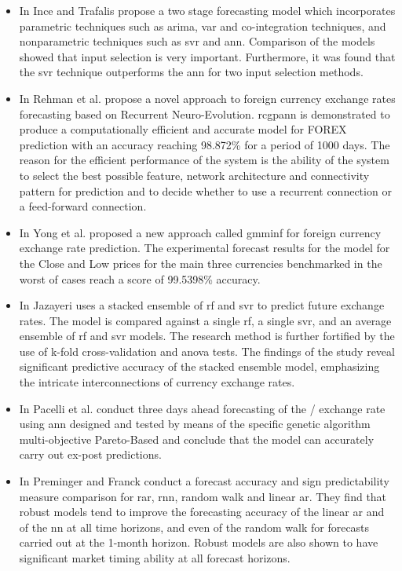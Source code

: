 \begin{itemize}
    \item In \cite{hybrid-model} Ince and Trafalis propose a two stage forecasting model which incorporates parametric techniques such as \gls{arima}, \gls{var} and co-integration techniques, and nonparametric techniques such as \gls{svr} and \gls{ann}. Comparison of the models showed that input selection is very important. Furthermore, it was found that the \gls{svr} technique outperforms the \gls{ann} for two input selection methods.
    \item In \cite{cgp-rnn} Rehman et al. propose a novel approach to foreign currency exchange rates forecasting based on Recurrent Neuro-Evolution. \Gls{rcgpann} is demonstrated to produce a computationally efficient and accurate model for FOREX prediction with an accuracy reaching 98.872\% for a period of 1000 days. The reason for the efficient performance of the system is the ability of the system to select the best possible feature, network architecture and connectivity pattern for prediction and to decide whether to use a recurrent connection or a feed-forward connection.
    \item In \cite{neuro-fuzzy} Yong et al. proposed a new approach called \gls{gmminf} for foreign currency exchange rate prediction. The experimental forecast results for the model for the Close and Low prices for the main three currencies benchmarked in the worst of cases reach a score of 99.5398\% accuracy.
    \item In \cite{rf-svr} Jazayeri uses a stacked ensemble of \gls{rf} and \gls{svr} to predict future exchange rates. The model is compared against a single \gls{rf}, a single \gls{svr}, and an average ensemble of \gls{rf} and \gls{svr} models. The research method is further fortified by the use of k-fold cross-validation and \gls{anova} tests. The findings of the study reveal significant predictive accuracy of the stacked ensemble model, emphasizing the intricate interconnections of currency exchange rates.
    \item In \cite{genetic} Pacelli et al. conduct three days ahead forecasting of the / exchange rate using \gls{ann} designed and tested by means of the specific genetic algorithm multi-objective Pareto-Based and conclude that the model can accurately carry out ex-post predictions.
    \item In \cite{robust-regression} Preminger and Franck conduct a forecast accuracy and sign predictability measure comparison for \gls{rar}, \gls{rnn}, random walk and linear \gls{ar}. They find that robust models tend to improve the forecasting accuracy of the linear \gls{ar} and of the \gls{nn} at all time horizons, and even of the random walk for forecasts carried out at the 1-month horizon. Robust models are also shown to have significant market timing ability at all forecast horizons.
\end{itemize}


